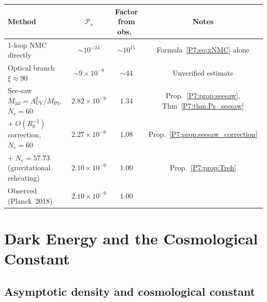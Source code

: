 \documentclass[11pt,a4paper]{article}
\theoremstyle{definition}
\theoremstyle{remark}
\newcommand{\MPl}{M_{\mathrm{Pl}}}
\newcommand{\LUV}{\Lambda_{\mathrm{UV}}}
\begin{document}
\begin{center}
\renewcommand{\arraystretch}{1.3}
\begin{tabular}{lccc}
\toprule
Method & $\mathcal{P}_s$ & Factor from obs.\ & Notes \\
\midrule
1-loop NMC directly & $\sim10^{-24}$ & $\sim10^{15}$ & Formula~\eqref{P7:eq:xNMC} alone \\
Optical branch $\xi\approx90$ & $\sim9\times10^{-8}$ & $\sim44$ & Unverified estimate \\
See-saw $M_{\mathrm{inf}}=\LUV^2/\MPl$, $N_e=60$ & $2.82\times10^{-9}$ & $1.34$ & Prop.~\ref{P7:prop:seesaw}, Thm~\ref{P7:thm:Ps_seesaw} \\
$+\;O(R_0^{-2})$ correction, $N_e=60$ & $2.27\times10^{-9}$ & $1.08$ & Prop.~\ref{P7:prop:seesaw_correction} \\
$+\;N_e=57.73$ (gravitational reheating) & $2.10\times10^{-9}$ & $1.00$ & Prop.~\ref{P7:prop:Treh} \\
Observed (Planck~2018) & $2.10\times10^{-9}$ & $1.00$ & \cite{Planck2018} \\
\bottomrule
\end{tabular}
\end{center}

\section{Dark Energy and the Cosmological Constant}
\label{P7:sec:de}

\subsection{Asymptotic density and cosmological constant}
\end{document}
